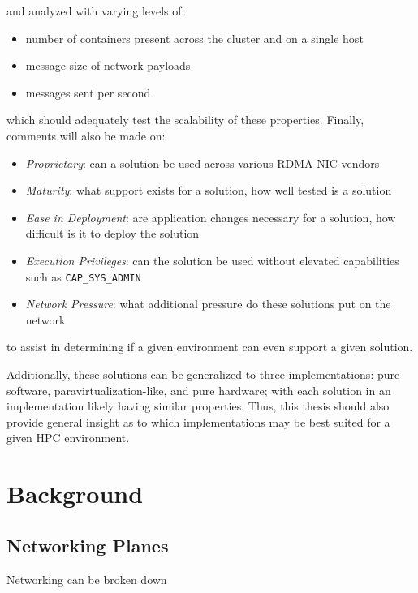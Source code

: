 \documentclass[12pt,titlepage]{article}
\begin{document}
\noindent
and analyzed with varying levels of:
\begin{itemize}[nolistsep]
   \item number of containers present across the cluster and on a single host
   \item message size of network payloads
   \item messages sent per second
\end{itemize}
which should adequately test the scalability of these properties.
Finally, comments will also be made on:
\begin{itemize}[nolistsep]
   \item \textit{Proprietary}: can a solution be used across various RDMA NIC vendors
   \item \textit{Maturity}: what support exists for a solution, how well tested is a solution
   \item \textit{Ease in Deployment}: are application changes necessary for a solution, how difficult is it to deploy the solution
   \item \textit{Execution Privileges}: can the solution be used without elevated capabilities such as \texttt{CAP\_SYS\_ADMIN}
   \item \textit{Network Pressure}: what additional pressure do these solutions put on the network
\end{itemize}
to assist in determining if a given environment can even support a given solution.

Additionally, these solutions can be generalized to three implementations: pure software, paravirtualization-like, and pure hardware;
with each solution in an implementation likely having similar properties.
Thus, this thesis should also provide general insight as to which implementations may be best suited for a given HPC environment.


\section{Background}
\subsection{Networking Planes}
Networking can be broken down
\end{document}
